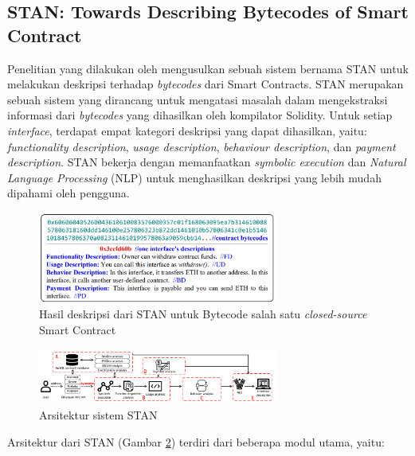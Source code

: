 \subsection{STAN: Towards Describing Bytecodes of Smart Contract}
\label{subsec:stan}

Penelitian yang dilakukan oleh \cite{stan} mengusulkan sebuah sistem bernama STAN untuk melakukan deskripsi terhadap \textit{bytecodes} dari Smart Contracts. STAN merupakan sebuah sistem yang dirancang untuk mengatasi masalah dalam mengekstraksi informasi dari \textit{bytecodes} yang dihasilkan oleh kompilator Solidity. Untuk setiap \textit{interface}, terdapat empat kategori deskripsi yang dapat dihasilkan, yaitu: \textit{functionality description}, \textit{usage description}, \textit{behaviour description}, dan \textit{payment description}. STAN bekerja dengan memanfaatkan \textit{symbolic execution} dan \textit{Natural Language Processing} (NLP) untuk menghasilkan deskripsi yang lebih mudah dipahami oleh pengguna.

\begin{figure}[ht]
  \centering
  \includegraphics[width=0.7\textwidth]{resources/chapter-2/stan-desc.png}
  \caption{Hasil deskripsi dari STAN untuk Bytecode salah satu \textit{closed-source} Smart Contract \parencite{stan}}
  \label{image:stan-desc}
\end{figure}

\begin{figure}[ht]
  \centering
  \includegraphics[width=0.7\textwidth]{resources/chapter-2/stan-architecture.png}
  \caption{Arsitektur sistem STAN \parencite{stan}}
  \label{image:stan-architecture}
\end{figure}

Arsitektur dari STAN (Gambar \ref{image:stan-architecture}) terdiri dari beberapa modul utama, yaitu:

